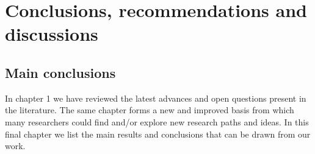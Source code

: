\chapter{Conclusions, recommendations and discussions}



\section{Main conclusions}

In chapter 1 we have reviewed the latest advances and open questions present in the literature. The same chapter forms a new and improved basis from which many researchers could find and/or explore new research paths and ideas. In this final chapter we list the main results and conclusions that can be drawn from our work.

